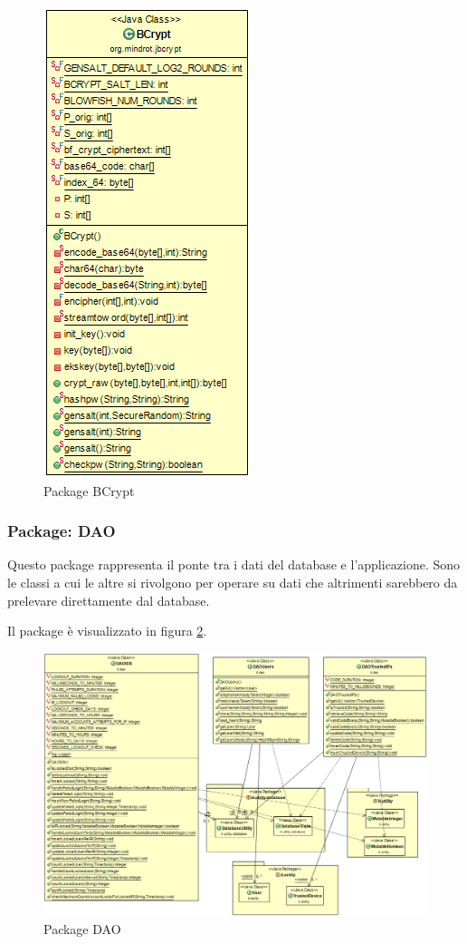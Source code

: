 \begin{figure}[!htbp]
	\centering
	\includegraphics[scale = .5]{img/dependencies_bcrypt}
	\caption{Package BCrypt}
	\label{gfx:dependencies_bcrypt}
\end{figure}

\subsubsection{Package: \textbf{DAO}}

Questo package rappresenta il ponte tra i dati del database e l’applicazione. Sono le classi a cui le altre si rivolgono per operare su dati che altrimenti sarebbero da prelevare direttamente dal database. 

Il package è visualizzato in figura \ref{gfx:dependencies_dao}.

\begin{figure}[!htbp]
	\centering
	\includegraphics[scale = .4]{img/dependencies_dao}
	\caption{Package DAO}
	\label{gfx:dependencies_dao}
\end{figure}

